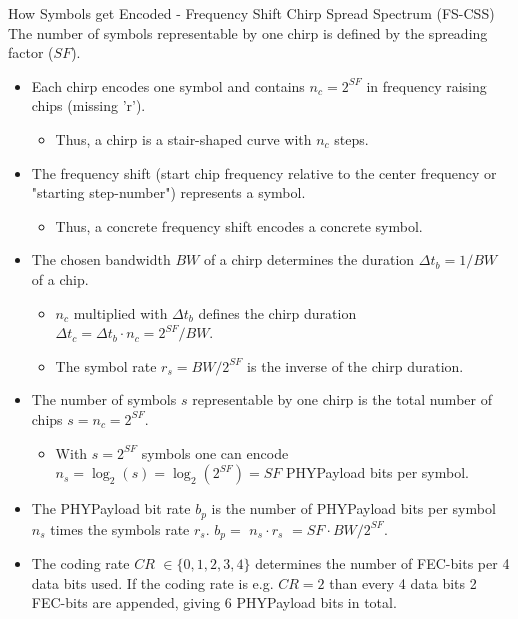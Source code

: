 \begin{frame}{How Symbols get Encoded - \alert{Frequency Shift} Chirp Spread Spectrum (FS-CSS)}
The \alert{number of symbols} representable by one chirp is defined by the \alert{spreading factor} ($SF$).
  \begin{itemize}
    \item \alert{Each chirp} encodes \alert{one symbol} and contains $n_c = 2^{SF}$ in frequency raising \alert{chips} (missing 'r').
    \begin{itemize}
      \item[$\Rightarrow$] Thus, a chirp is a \alert{stair-shaped curve} with \alert{$n_c$ steps}.
    \end{itemize}
    \item The \alert{frequency shift} (start chip frequency relative to the center frequency or "{}starting step-number"{}) represents a \alert{symbol}.
    \begin{itemize}
      \item[$\Rightarrow$] Thus, a \alert{concrete frequency shift} encodes a \alert{concrete symbol}.
    \end{itemize}
    \item The chosen \alert{bandwidth $BW$ of a chirp} determines the \alert{duration} $\Delta t_b = 1 / BW$ of a \alert{chip}.
    \begin{itemize}
      \item[$\Rightarrow$] $n_c$ multiplied with $\Delta t_b$ defines the \alert{chirp duration} $\Delta t_c = \Delta t_b \cdot n_c = 2^{SF} / BW$.
      \item[$\Rightarrow$] The \alert{symbol rate} $r_s = BW / 2^{SF}$ is the \alert{inverse of the chirp duration}.
    \end{itemize}
    \item The \alert{number of symbols} $s$ \alert{representable by one} chirp is the \alert{total number of chips} $s = n_c = 2^{SF}$.
    \begin{itemize}
      \item[$\Rightarrow$] With $s = 2^{SF}$ symbols one can encode \alert{$n_s = \log_2(s) = \log_2\left(2^{SF}\right)= SF$} PHYPayload \alert{bits per symbol}.
    \end{itemize}
    \item The \alert{PHYPayload bit rate} $b_p$ is the number of \alert{PHYPayload bits per symbol $n_s$} times the \alert{symbols rate $r_s$}. \textcolor{fh-ooe-red}{$b_p =$} $ n_s \cdot r_s$ \textcolor{fh-ooe-red}{$= SF \cdot BW / 2^{SF}$}.
    \item The \alert{coding rate $CR$} $\in \{0, 1, 2, 3, 4\}$ determines the number of \alert{FEC-bits} per \alert{4 data bits} used. If the coding rate is e.g. $CR = 2$ than every \textcolor{fh-ooe-red}{4} \alert{data bits} \textcolor{fh-ooe-red}{2} \alert{FEC-bits} are appended, giving \textcolor{fh-ooe-red}{6} \alert{PHYPayload bits} in total.

\end{itemize}
\end{frame}

